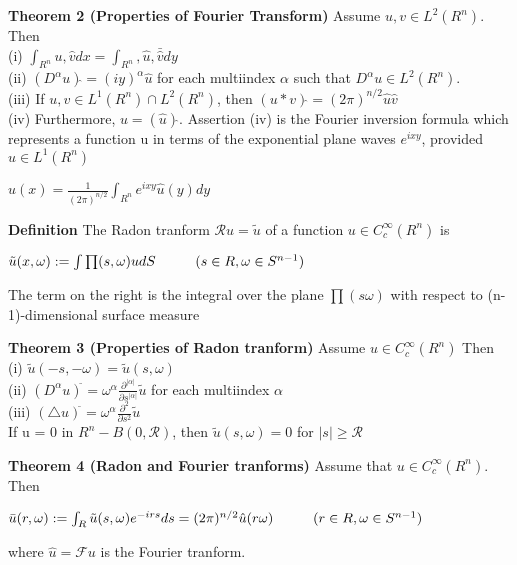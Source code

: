 \documentclass{article}
\newcommand\tab[1][1cm]{\hspace*{#1}}
\begin{document}
\textbf {Theorem 2 (Properties of Fourier Transform)} Assume $u, v \in L^2(R^n)$. Then \\
\tab (i) $\int_{R^n} u, \hat{v}dx = \int_{R^n}, \hat{u}, \bar{\hat{v}} dy$ \\
\tab (ii) $(D^{\alpha}u)\hat{} = (iy)^{\alpha} \hat{u}$ \tab for each multiindex $\alpha$ such that $D^{\alpha}u \in L^2 (R^n)$. \\
\tab (iii) If $u, v \in L^1(R^n) \cap L^2(R^n)$, then $(u * v)\hat{} = (2\pi)^{n/2}\hat{u}\hat{v}$ \\
\tab (iv) Furthermore, $u = (\hat{u})\widehat{}$.
Assertion (iv) is the Fourier inversion formula which represents a function u in terms of the exponential plane waves $e^{ixy}$, provided $\hat{u} \in L^1(R^n)$
\begin{center}
$u(x) = \frac{1}{(2\pi)^{n/2}} \int_{R^n} e^{ixy} \hat{u} (y) dy$
\end{center}

\textbf {Definition} The Radon tranform $\mathcal{R}u = \tilde{u}$ of a function $u \in C_c^{\infty}(R^n)$ is 
\begin{center}
$\tilde{u}(x, \omega) := \int{\prod (s, \omega)} udS \tab (s \in R, \omega \in S^{n-1})$
\end{center}
The term on the right is the integral over the plane $\prod (s \omega)$ with respect to (n-1)-dimensional surface measure

\textbf {Theorem 3 (Properties of Radon tranform)} Assume $u \in C_c^{\infty}(R^n)$ Then  \\
\tab (i) $\tilde{u}(-s, -\omega) = \tilde{u}(s, \omega)$ \\
\tab (ii) $(D^{\alpha}u)^{\tilde{}} = \omega^{\alpha} \frac{\partial^{|\alpha|}}{\partial s^{|\alpha|}} \tilde{u}$ for each multiindex $\alpha$ \\
\tab (iii) $(\triangle u)^{\tilde{}} = \omega^{\alpha} \frac{\partial^2}{\partial s^2} \tilde{u}$ \\
\tab If u = 0 in $R^n - B(0, \mathcal{R})$, then $\tilde{u}(s, \omega) = 0$ for $|s| \geq \mathcal{R}$

\textbf {Theorem 4 (Radon and Fourier tranforms)} Assume that $u \in C_c^\infty (R^n)$. Then 
\begin{center}
$\bar{u}(r, \omega) := \int_R \tilde{u}(s, \omega)e^{-irs}ds = (2\pi)^{n/2} \hat{u}(r\omega) \tab (r \in R, \omega \in S^{n-1})$
\end{center}
where $\hat{u} = \mathcal{F}u$ is the Fourier tranform.
\end{document}
